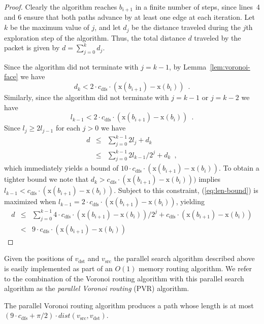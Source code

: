 \documentclass[final]{siamltex}
\newcommand{\comment}[1]{}
\newcommand{\eqlabel}[1]{\label{eq:#1}}
\newcommand{\eqref}[1]{(\ref{eq:#1})}
\newcommand{\thmlabel}[1]{\label{thm:#1}}
\newcommand{\lemref}[1]{Lemma~\ref{lem:#1}}
\newcommand{\x}{\mathrm{x}}
\newcommand{\dist}{\mathit{dist}}
\newcommand{\vsrc}{v_\mathrm{src}}
\newcommand{\vdest}{v_\mathrm{dst}}
\newcommand{\cdfs}{c_\mathrm{dfs}}
\begin{document}
\begin{proof}
Clearly the algorithm reaches $b_{i+1}$ in a finite number of steps,
since lines~4 and 6 ensure that both paths advance by at least one
edge at each iteration.  Let $k$ be the maximum value of $j$, and let
$d_j$ be the distance traveled during the $j$th exploration step of
the algorithm.  Thus, the total distance $d$ traveled by the packet
is given by $d = \sum_{j=0}^{k}d_j$.

Since the algorithm did not terminate with $j=k-1$, by
\lemref{voronoi-face} we have
\begin{equation}
d_k < 2\cdot\cdfs\cdot(\x(b_{i+1})-\x(b_i)) \enspace .
\end{equation}
Similarly, since the algorithm did not terminate with $j=k-1$ or
$j=k-2$ we have
\begin{equation}
l_{k-1} < 2\cdot\cdfs\cdot(\x(b_{i+1})-\x(b_i)) \enspace .
\end{equation}
Since $l_j \ge 2l_{j-1}$ for each $j>0$ we have
\begin{eqnarray}
d & \le & \sum_{j=0}^{k-1}2l_j + d_k \\
  &\le& \sum_{j=0}^{k-1}2l_{k-1}/2^j + d_k \enspace , \eqlabel{len-bound}
\end{eqnarray}
which immediately yields a bound of $10\cdot\cdfs\cdot(\x(b_{i+1})-\x(b_i))$.
To obtain a tighter bound we note that
$d_k>\cdfs\cdot(\x(b_{i+1})-\x(b_i)))$ implies
$l_{k-1}<\cdfs\cdot(\x(b_{i+1})-\x(b_i))$.  Subject to this constraint,
\eqref{len-bound} is maximized when
$l_{k-1}=2\cdot\cdfs\cdot(\x(b_{i+1})-\x(b_i))$, yielding
\begin{eqnarray}
d & \le &  \sum_{j=0}^{k-1}4\cdot\cdfs\cdot(\x(b_{i+1})-\x(b_i))/2^j 
		+ \cdfs\cdot(\x(b_{i+1})-\x(b_i)) \\ 
  & < & 9\cdot\cdfs\cdot(\x(b_{i+1})-\x(b_i)) 
\end{eqnarray}
\qquad\end{proof}

\comment{ \noindent{\bf Remark:} The parallel search algorithm
described above can be improved in practice by using diagonals of
$F$. }

Given the positions of $\vdest$ and $\vsrc$ the parallel search
algorithm described above is easily implemented as part of an $O(1)$
memory routing algorithm.  We refer to the combination of the Voronoi
routing algorithm with this parallel search algorithm as the {\em
parallel Voronoi routing\/} (PVR) algorithm.

\begin{theorem}\thmlabel{competitive}
The parallel Voronoi routing algorithm produces a path whose length is
at most $(9\cdot\cdfs+\pi/2)\cdot\dist(\vsrc,\vdest)$.
\end{theorem}
\end{document}
